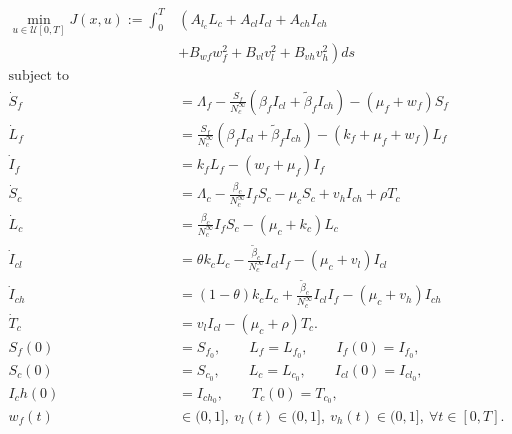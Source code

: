 \documentclass[preprint, 12pt]{elsarticle}
\begin{document}
\begin{equation}
    \label{eqn:optimal_problem}
    \begin{aligned}
        \min_{u \in \mathcal{U}[0, T]}
            J(x, u) :=
                \int_0 ^T
                    &
                    \left(
                        A_{l_c} L_c
                        + A_{cl} I_{cl}
                        + A_{ch} I_{ch}
                    \right.
           \\
            &
            \left.
                + B_{wf}  w_f ^ 2
                + B_{vl}  v_l ^ 2
                + B_{vh}  v_h ^ 2
            \right)
            ds
%
    \\
    \text{subject to} &
    \\
    \dot{S}_f &=
        \Lambda_f
        -\frac{
            S_f
         }{
            N_c^{\infty}}
            \left(
                \beta_fI_{cl} + \tilde{ \beta }_f I_{ch}
            \right)
            -\left(
                \mu_f + w_f
             \right) S_f
    \\
    \dot{L}_f &=
        \frac{
            S_f
        }{
            N_c^{\infty}}
            \left(
                \beta_f I_{cl}
                +
                 \tilde{\beta}_f I_{ch}
            \right)
            -\left(
                k_f + \mu_f + w_f
             \right) L_f
    \\
    \dot{I}_f &=
        k_f L_f
        -\left(
            w_f + \mu_f
        \right) I_f
    \\
    \dot{S}_c&=
        \Lambda_c
        -\frac{
            \beta_c
         }{
            N_c^{\infty}
        } I_fS_c
        -\mu_cS_c + v_h I_{ch} + \rho T_c
    \\
    \dot{L}_c &=
        \frac{
            \beta_c
        }{
            N_c^{\infty}
        } I_fS_c
        -\left(
            \mu_c + k_c
        \right) L_c
    \\
    \dot{I}_{cl} &=
        \theta k_c L_c
        - \frac{
            \tilde{\beta}_c
         }{
            N_c^{\infty}
         } I_{cl} I_f
         -( \mu_c + v_l ) I_{cl}
    \\
    \dot{I}_{ch}&=
        (1-\theta) k_c L_c
        +
        \frac{
            \tilde{\beta}_c
        }{
            N_c^{\infty}
        } I_{cl}I_f
        - (
            \mu_c + v_h
          ) I_{ch}
    \\
    \dot{T}_c&=
        v_l I_{cl}
        -\left(
            \mu_c + \rho
         \right) T_c .
    \\
        S_f(0) &= S_{f_0}, \qquad
        L_{f} = L_{f_0}, \qquad
        I_f(0) = I_{f_0}, \qquad
    \\
        S_c(0) &= S_{c_0}, \qquad
        L_{c} = L_{c_0}, \qquad
        I_{cl}(0) = I_{{cl}_0}, \qquad
    \\
        I_ch(0) &= I_{ch_0}, \qquad
        T_c(0) = T_{c_0},
    \\
        w_f(t) &\in (0, 1],
        \
        v_{l}(t) \in (0, 1],
        \
        v_{h}(t) \in (0, 1], \  \forall t \in [0, T].
    \end{aligned}
\end{equation}
\end{document}
